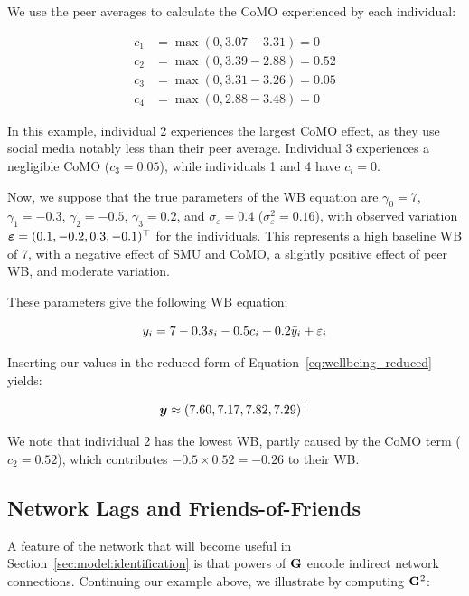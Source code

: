We use the peer averages to calculate the CoMO experienced by each individual:

\begin{align}
    c_1 &= \max(0, 3.07 - 3.31) = 0 \\
    c_2 &= \max(0, 3.39 - 2.88) = 0.52 \\
    c_3 &= \max(0, 3.31 - 3.26) = 0.05 \\
    c_4 &= \max(0, 2.88 - 3.48) = 0
\end{align}

In this example, individual 2 experiences the largest CoMO effect, as they use social media notably less than their peer average. Individual 3 experiences a negligible CoMO ($c_3 = 0.05$), while individuals 1 and 4 have $c_i = 0$.

Now, we suppose that the true parameters of the WB equation are $\gamma_0 = 7$, $\gamma_1 = -0.3$, $\gamma_2 = -0.5$, $\gamma_3 = 0.2$, and $\sigma_\varepsilon = 0.4$ ($\sigma_\varepsilon^2 = 0.16$), with observed variation $\bm{\varepsilon} = (0.1, -0.2, 0.3, -0.1)^\top$ for the individuals. This represents a high baseline WB of 7, with a negative effect of SMU and CoMO, a slightly positive effect of peer WB, and moderate variation.

These parameters give the following WB equation:

\begin{equation}
    y_i = 7 - 0.3 s_i - 0.5 c_i + 0.2 \bar{y}_i + \varepsilon_i
\end{equation}

Inserting our values in the reduced form of Equation~\eqref{eq:wellbeing_reduced} yields:

\begin{equation}
    \bm{y} \approx (7.60, 7.17, 7.82, 7.29)^\top
\end{equation}

We note that individual 2 has the lowest WB, partly caused by the CoMO term ($c_2 = 0.52$), which contributes $-0.5 \times 0.52 = -0.26$ to their WB\@.

\subsection{Network Lags and Friends-of-Friends}
\label{sec:model:network_lags}
A feature of the network that will become useful in Section~\ref{sec:model:identification} is that powers of $\mathbf{G}$ encode indirect network connections. Continuing our example above, we illustrate by computing $\mathbf{G}^2$:

